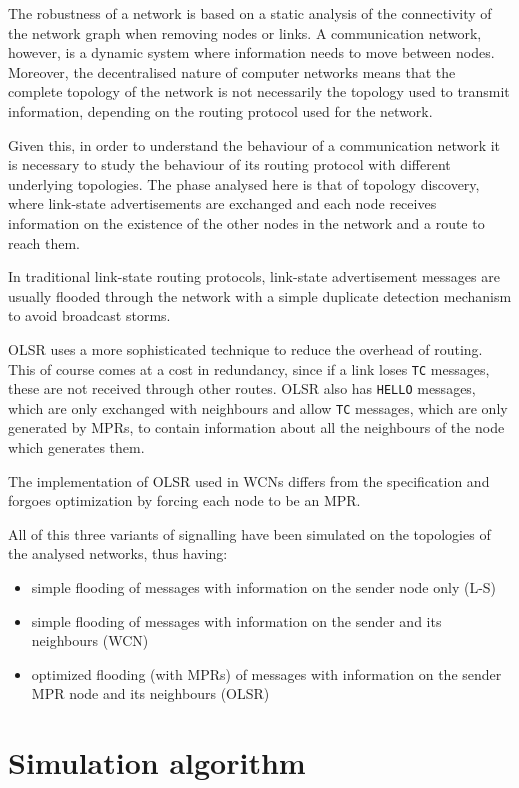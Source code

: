 \documentclass[a4paper,11pt,twoside,openleft]{memoir}
\begin{document}
The robustness of a network is based on a static analysis of the
connectivity of the network graph when removing nodes or links. A
communication network, however, is a dynamic system where information
needs to move between nodes. Moreover, the decentralised nature of
computer networks means that the complete topology of the network is not
necessarily the topology used to transmit information, depending on the
routing protocol used for the network.

Given this, in order to understand the behaviour of a communication
network it is necessary to study the behaviour of its routing protocol
with different underlying topologies. The phase analysed here is that of
topology discovery, where link-state advertisements are exchanged and
each node receives information on the existence of the other nodes in
the network and a route to reach them.

In traditional link-state routing protocols, link-state advertisement
messages are usually flooded through the network with a simple duplicate
detection mechanism to avoid broadcast storms.

OLSR uses a more sophisticated technique to reduce the overhead of
routing. This of course comes at a cost in redundancy, since if a link
loses \texttt{TC} messages, these are not received through other routes.
OLSR also has \texttt{HELLO} messages, which are only exchanged with
neighbours and allow \texttt{TC} messages, which are only generated by
MPRs, to contain information about all the neighbours of the node which
generates them.

The implementation of OLSR used in WCNs differs from the specification
and forgoes optimization by forcing each node to be an MPR.

All of this three variants of signalling have been simulated on the
topologies of the analysed networks, thus having:

\begin{itemize}
\itemsep1pt\parskip0pt
\item
  simple flooding of messages with information on the sender node only
  (L-S)
\item
  simple flooding of messages with information on the sender and its
  neighbours (WCN)
\item
  optimized flooding (with MPRs) of messages with information on the
  sender MPR node and its neighbours (OLSR)
\end{itemize}

\section{Simulation algorithm}\label{simulation-algorithm}
\end{document}
